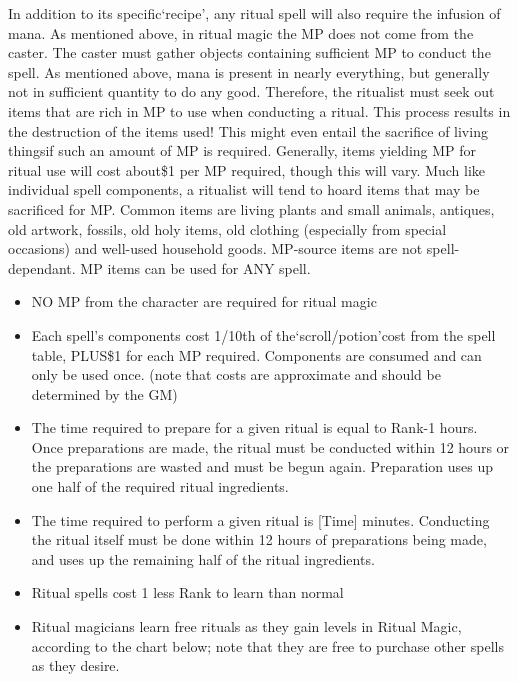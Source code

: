 \documentclass[twoside]{book}
\begin{document}
    {  
    In addition to its specific`recipe', any ritual spell will also require the infusion of mana. As mentioned above, in ritual magic the MP does not come from the caster. The caster must gather objects containing sufficient MP to conduct the spell. As mentioned above, mana is present in nearly everything, but generally not in sufficient quantity to do any good. Therefore, the ritualist must seek out items that are rich in MP to use when conducting a ritual. This process results in the destruction of the items used! This might even entail the sacrifice of living thingsif such an amount of MP is required. Generally, items yielding MP for ritual use will cost about\$1 per MP required, though this will vary. Much like individual spell components, a ritualist will tend to hoard items that may be sacrificed for MP. Common items are living plants and small animals, antiques, old artwork, fossils, old holy items, old clothing (especially from special occasions) and well-used household goods. MP-source items are not spell-dependant. MP items can be used for ANY spell.
    }
  
\begin{itemize}
      
  \item NO MP from the character are required for ritual magic
  \item Each spell's components cost 1/10th of the`scroll/potion'cost from the spell table, PLUS\$1 for each MP required. Components are consumed and can only be used once. (note that costs are approximate and should be determined by the GM)
  \item The time required to prepare for a given ritual is equal to Rank-1 hours. Once preparations are made, the ritual must be conducted within 12 hours or the preparations are wasted and must be begun again. Preparation uses up one half of the required ritual ingredients.
  \item The time required to perform a given ritual is [Time] minutes. Conducting the ritual itself must be done within 12 hours of preparations being made, and uses up the remaining half of the ritual ingredients.
  \item Ritual spells cost 1 less Rank to learn than normal
  \item Ritual magicians learn free rituals as they gain levels in Ritual Magic, according to the chart below; note that they are free to purchase other spells as they desire.
\end{itemize}
  
\end{document}

